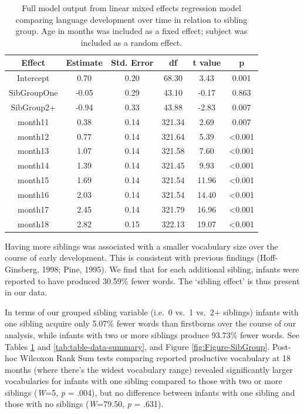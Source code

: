 \documentclass[
  english,
  man,floatsintext]{apa6}
\begin{document}
\begin{longtable}[t]{cccccc}
\caption{\label{tab:table-sibgroup-model-summary}Full model output from linear mixed effects regression model comparing language development over time in relation to sibling group. Age in months was included as a fixed effect; subject was included as a random effect.}\\
\toprule
Effect & Estimate & Std. Error & df & t value & p\\
\midrule
Intercept & 0.70 & 0.20 & 68.30 & 3.43 & 0.001\\
SibGroupOne & -0.05 & 0.29 & 43.10 & -0.17 & 0.863\\
SibGroup2+ & -0.94 & 0.33 & 43.88 & -2.83 & 0.007\\
month11 & 0.38 & 0.14 & 321.34 & 2.69 & 0.007\\
month12 & 0.77 & 0.14 & 321.64 & 5.39 & <0.001\\
\addlinespace
month13 & 1.07 & 0.14 & 321.58 & 7.60 & <0.001\\
month14 & 1.39 & 0.14 & 321.45 & 9.93 & <0.001\\
month15 & 1.69 & 0.14 & 321.54 & 11.96 & <0.001\\
month16 & 2.03 & 0.14 & 321.54 & 14.40 & <0.001\\
month17 & 2.45 & 0.14 & 321.79 & 16.96 & <0.001\\
\addlinespace
month18 & 2.82 & 0.15 & 322.13 & 19.07 & <0.001\\
\bottomrule
\end{longtable}

Having more siblings was associated with a smaller vocabulary size over the course of early development. This is consistent with previous findings (Hoff-Ginsberg, 1998; Pine, 1995). We find that for each additional sibling, infants were reported to have produced 30.59\% fewer words. The `sibling effect' is thus present in our data.

In terms of our grouped sibling variable (i.e.~0 vs.~1 vs.~2+ siblings) infants with one sibling acquire only 5.07\% fewer words than firstborns over the course of our analysis, while infants with two or more siblings produce 93.73\% fewer words. See Tables \ref{tab:table-sibgroup-model-summary} and \ref{tab:table-data-summary}, and Figure \ref{fig:Figure-SibGroup}. Post-hoc Wilcoxon Rank Sum tests comparing reported productive vocabulary at 18 months (where there's the widest vocabulary range) revealed significantly larger vocabularies for infants with one sibling compared to those with two or more siblings (\emph{W}=5, \emph{p} = .004), but no difference between infants with one sibling and those with no siblings (\emph{W}=79.50, \emph{p} = .631).
\end{document}
